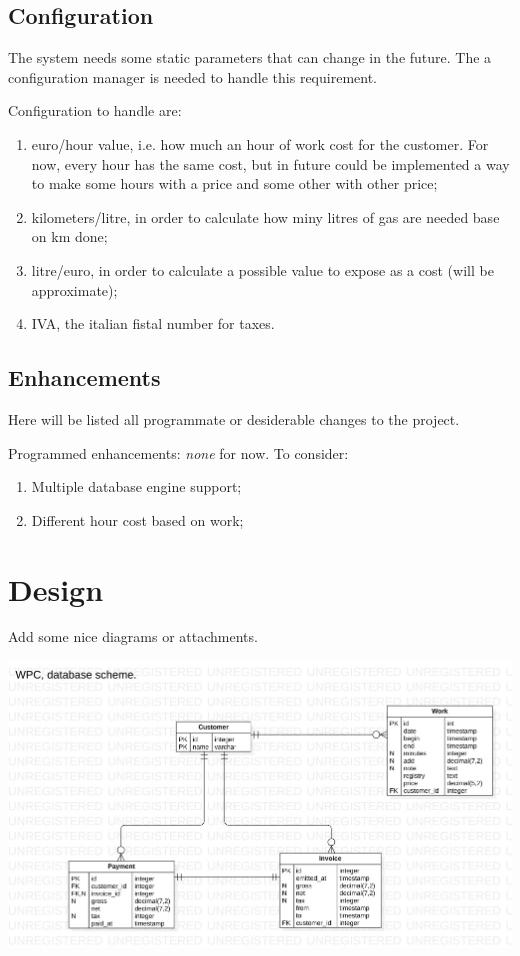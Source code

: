 \documentclass[11pt]{article}
\begin{document}
\subsection{Configuration}
\label{subsec:configuration}
The system needs some static parameters that can change in the future. The a configuration manager is needed to handle this requirement.

Configuration to handle are:
\begin{enumerate}[label=(\alph*)]
\item euro/hour value, i.e. how much an hour of work cost for the customer. For now, every hour has the same cost, but in future could be implemented a way to make some hours with a price and some other with other price;
\item kilometers/litre, in order to calculate how miny litres of gas are needed base on km done;
\item litre/euro, in order to calculate a possible value to expose as a cost (will be approximate);
\item IVA, the italian fistal number for taxes.
\end{enumerate}


\subsection{Enhancements}
\label{subsec:enhancements}
Here will be listed all programmate or desiderable changes to the project.

Programmed enhancements: \textit{none} for now.
To consider: 
\begin{enumerate}[label=(\alph*)]
\item Multiple database engine support;
\item Different hour cost based on work;
\end{enumerate}


\section{Design}
Add some nice diagrams or attachments.

\includegraphics[scale=0.4]{wpc_data_model}
\end{document}
